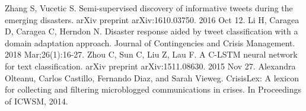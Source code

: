 \documentclass[unicode, 12pt, a4paper,oneside]{article}
\begin{document}
\begin{thebibliography}{10}
		 Zhang S, Vucetic S. Semi-supervised discovery of informative tweets during the emerging disasters. arXiv preprint arXiv:1610.03750. 2016 Oct 12.
		 Li H, Caragea D, Caragea C, Herndon N. Disaster response aided by tweet classification with a domain adaptation approach. Journal of Contingencies and Crisis Management. 2018 Mar;26(1):16-27.
		 Zhou C, Sun C, Liu Z, Lau F. A C-LSTM neural network for text classification. arXiv preprint arXiv:1511.08630. 2015 Nov 27.
		 Alexandra Olteanu, Carlos Castillo, Fernando Diaz, and Sarah Vieweg. CrisisLex: A lexicon for collecting and filtering microblogged communications in crises. In Proceedings of ICWSM, 2014. 
	\end{thebibliography}
		
\end{document}
